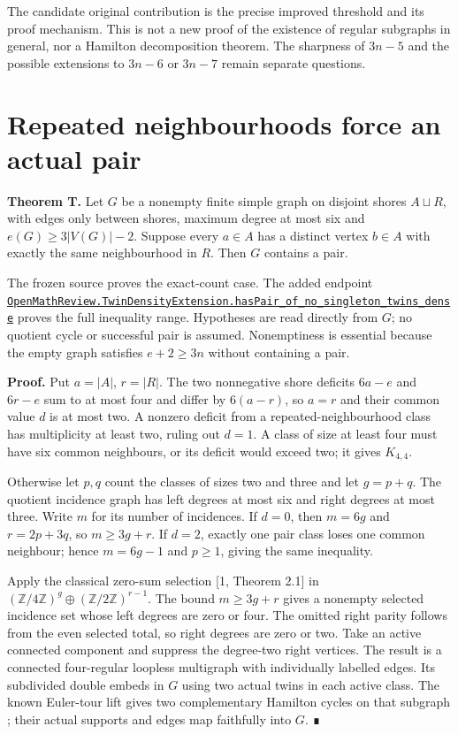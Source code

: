 \documentclass[smallextended]{svjour3}
\newcounter{none} %
\begin{document}
The candidate original contribution is the precise improved threshold
and its proof mechanism. This is not a new proof of the existence of
regular subgraphs in general, nor a Hamilton decomposition theorem. The
sharpness of \(3n-5\) and the possible extensions to \(3n-6\) or
\(3n-7\) remain separate questions.

\section{Repeated neighbourhoods force an actual
pair}\label{repeated-neighbourhoods-force-an-actual-pair}

\textbf{Theorem T.} Let \(G\) be a nonempty finite simple graph on
disjoint shores \(A\sqcup R\), with edges only between shores, maximum
degree at most six and \(e(G)\geq3|V(G)|-2\). Suppose every \(a\in A\)
has a distinct vertex \(b\in A\) with exactly the same neighbourhood in
\(R\). Then \(G\) contains a pair.

The frozen source proves the exact-count case. The added endpoint
\href{https://github.com/alejandrozu/openmath-2026-judging/blob/70c5ec3107658182f22c207d4c50f53f9cb3e602/robert-review-2026-10-07/lean/TwinDensityExtension.lean\#L132}{\texttt{OpenMathReview.TwinDensityExtension.hasPair\_of\_no\_singleton\_twins\_dense}}
proves the full inequality range. Hypotheses are read directly from
\(G\); no quotient cycle or successful pair is assumed. Nonemptiness is
essential because the empty graph satisfies \(e+2\geq3n\) without
containing a pair.

\textbf{Proof.} Put \(a=|A|\), \(r=|R|\). The two nonnegative shore
deficits \(6a-e\) and \(6r-e\) sum to at most four and differ by
\(6(a-r)\), so \(a=r\) and their common value \(d\) is at most two. A
nonzero deficit from a repeated-neighbourhood class has multiplicity at
least two, ruling out \(d=1\). A class of size at least four must have
six common neighbours, or its deficit would exceed two; it gives
\(K_{4,4}\).

Otherwise let \(p,q\) count the classes of sizes two and three and let
\(g=p+q\). The quotient incidence graph has left degrees at most six and
right degrees at most three. Write \(m\) for its number of incidences.
If \(d=0\), then \(m=6g\) and \(r=2p+3q\), so \(m\geq3g+r\). If \(d=2\),
exactly one pair class loses one common neighbour; hence \(m=6g-1\) and
\(p\geq1\), giving the same inequality.

Apply the classical zero-sum selection {[}1, Theorem 2.1{]} in
\((\mathbb Z/4\mathbb Z)^g\oplus(\mathbb Z/2\mathbb Z)^{r-1}\). The
bound \(m\geq3g+r\) gives a nonempty selected incidence set whose left
degrees are zero or four. The omitted right parity follows from the even
selected total, so right degrees are zero or two. Take an active
connected component and suppress the degree-two right vertices. The
result is a connected four-regular loopless multigraph with individually
labelled edges. Its subdivided double embeds in \(G\) using two actual
twins in each active class. The known Euler-tour lift gives two
complementary Hamilton cycles on that subgraph \cite{ref8}; their actual
supports and edges map faithfully into \(G\). ∎
\end{document}
